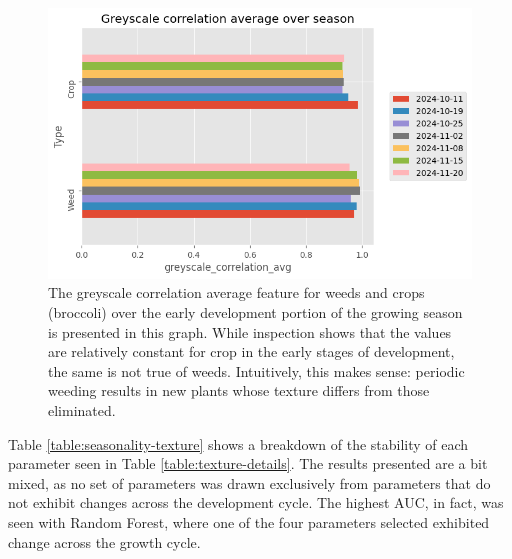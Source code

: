 \documentclass[letterpaper, notitlepage]{report}
\begin{document}
\begin{figure}[H]
	\centering
	\includegraphics[width=12cm]{./figures/plot-over-season.png}
	\caption[Greyscale Correlation Average over growing season]{The greyscale correlation average feature for weeds and crops (broccoli) over the early development portion of the growing season is presented in this graph. While inspection shows that the values are relatively constant for crop in the early stages of development, the same is not true of weeds. Intuitively, this makes sense: periodic weeding results in new plants whose texture differs from those eliminated.}
	\label{fig:season-texture-correlation}
\end{figure}
 
 Table \ref{table:seasonality-texture} shows a breakdown of the stability of each parameter seen in Table \ref{table:texture-details}. The results presented are a bit mixed, as no set of parameters was drawn exclusively from parameters that do not exhibit changes across the development cycle. The highest AUC, in fact, was seen with Random Forest, where one of the four parameters selected exhibited change across the growth cycle.
 
 {
\renewcommand{\arraystretch}{1.2}




}
\end{document}
